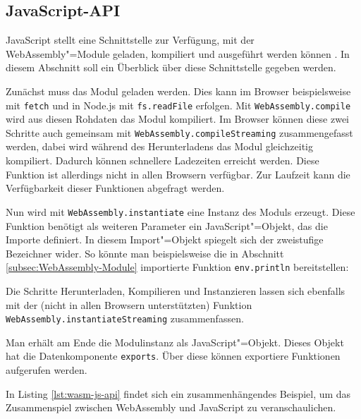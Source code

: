 \subsection{JavaScript-API}
\label{subsec:WebAssembly-JavaScript-API}
JavaScript stellt eine Schnittstelle zur Verfügung, mit der WebAssembly"=Module geladen, kompiliert und ausgeführt werden können \cite{MDNWebAssembly}. In diesem Abschnitt soll ein Überblick über diese Schnittstelle gegeben werden.

Zunächst muss das Modul geladen werden. Dies kann im Browser beispielsweise mit \lstinline{fetch} und in Node.js mit \lstinline{fs.readFile} erfolgen. Mit \lstinline{WebAssembly.compile} wird aus diesen Rohdaten das Modul kompiliert. Im Browser können diese zwei Schritte auch gemeinsam mit \lstinline{WebAssembly.compileStreaming} zusammengefasst werden, dabei wird während des Herunterladens das Modul gleichzeitig kompiliert. Dadurch können schnellere Ladezeiten erreicht werden. Diese Funktion ist allerdings nicht in allen Browsern verfügbar. Zur Laufzeit kann die Verfügbarkeit dieser Funktionen abgefragt werden.

Nun wird mit \lstinline{WebAssembly.instantiate} eine Instanz des Moduls erzeugt. Diese Funktion benötigt als weiteren Parameter ein JavaScript"=Objekt, das die Importe definiert. In diesem Import"=Objekt spiegelt sich der zweistufige Bezeichner wider. So könnte man beispielsweise die in Abschnitt \ref{subsec:WebAssembly-Module} importierte Funktion \lstinline{env.println} bereitstellen:



Die Schritte Herunterladen, Kompilieren und Instanzieren lassen sich ebenfalls mit der (nicht in allen Browsern unterstützten) Funktion \lstinline{WebAssembly.instantiateStreaming} zusammenfassen.

Man erhält am Ende die Modulinstanz als JavaScript"=Objekt. Dieses Objekt hat die Datenkomponente \lstinline{exports}. Über diese können exportiere Funktionen aufgerufen werden.

In Listing \ref{lst:wasm-js-api} findet sich ein zusammenhängendes Beispiel, um das Zusammenspiel zwischen WebAssembly und JavaScript zu veranschaulichen.



